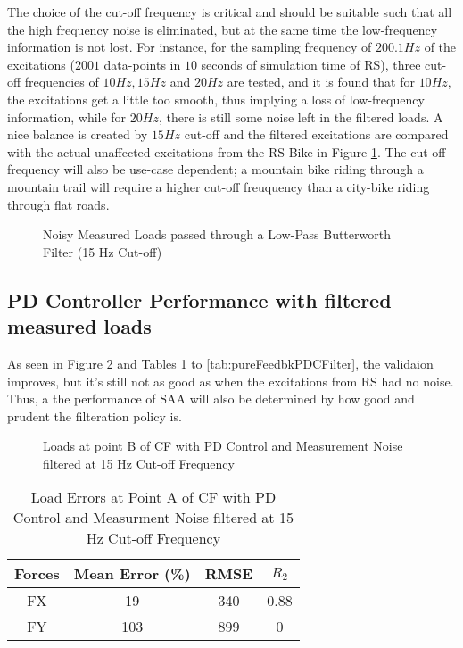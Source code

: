 The choice of the cut-off frequency is critical and should be suitable such that all the high frequency noise is eliminated, but at the same time the low-frequency information is not lost. For instance, for the sampling frequency of $200.1 Hz$ of the excitations ($2001$ data-points in $10$ seconds of simulation time of RS), three cut-off frequencies of $10 Hz, 15 Hz$ and $20 Hz$ are tested, and it is found that for $10 Hz$, the excitations get a little too smooth, thus implying a loss of low-frequency information, while for $20 Hz$, there is still some noise left in the filtered loads. A nice balance is created by $15 Hz$ cut-off and the filtered excitations are compared with the actual unaffected excitations from the RS Bike in Figure \ref{fig:Filter15}. The cut-off frequency will also be use-case dependent; a mountain bike riding through a mountain trail will require a higher cut-off freuquency than a city-bike riding through flat roads.

\begin{figure}[h!]
	\centering
	\scalebox{0.6}{
		\begin{tikzpicture}
			
	\end{tikzpicture}}
	\caption{Noisy Measured Loads passed through a Low-Pass Butterworth Filter (15 Hz Cut-off)}
	\label{fig:Filter15}
\end{figure}


\subsection*{PD Controller Performance with filtered measured loads}	
As seen in Figure \ref{fig:BFilter} and Tables \ref{tab:pureFeedbkPDAFilter} to \ref{tab:pureFeedbkPDCFilter}, the validaion improves, but it's still not as good as when the excitations from RS had no noise. Thus, a the performance of SAA will also be determined by how good and prudent the filteration policy is.
\begin{figure}[h!]
	\centering
	\scalebox{0.8}{
		\begin{tikzpicture}
			
	\end{tikzpicture}}
	\caption{Loads at point B of CF with PD Control and Measurement Noise filtered at 15 Hz Cut-off Frequency}
	\label{fig:BFilter}
\end{figure}

\begin{table}[h!]
	\centering
	\begin{tabular}{ |c|c|c|c| } 
		\hline
		Forces & Mean Error (\%) & RMSE & $R_2$\\ 
		\hline
		FX & 19&340&0.88\\ 
		FY & 103&899&0 \\ 
		\hline
	\end{tabular}
	\caption{Load Errors at Point A of CF with PD Control and Measurment Noise filtered at 15 Hz Cut-off Frequency}
	\label{tab:pureFeedbkPDAFilter}
\end{table}

